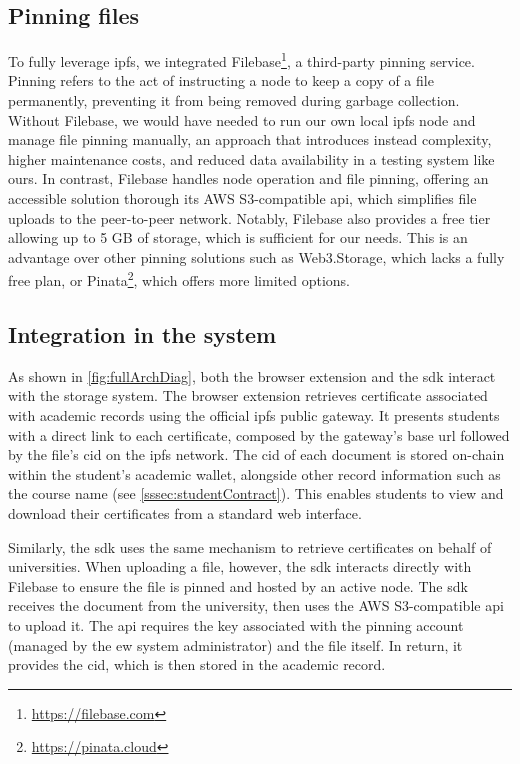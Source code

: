 \subsection{Pinning files}
To fully leverage \acrshort{ipfs}, we integrated Filebase\footnote{\url{https://filebase.com}}, a third-party pinning service. Pinning refers to the act of instructing a node to keep a copy of a file permanently, preventing it from being removed during garbage collection. Without Filebase, we would have needed to run our own local \acrshort{ipfs} node and manage file pinning manually, an approach that introduces instead complexity, higher maintenance costs, and reduced data availability in a testing system like ours. In contrast, Filebase handles node operation and file pinning, offering an accessible solution thorough its AWS S3-compatible \acrshort{api}, which simplifies file uploads to the peer-to-peer network. Notably, Filebase also provides a free tier allowing up to 5 GB of storage, which is sufficient for our needs. This is an advantage over other pinning solutions such as Web3.Storage, which lacks a fully free plan, or Pinata\footnote{\url{https://pinata.cloud}}, which offers more limited options.

\subsection{Integration in the system}
As shown in \cref{fig:fullArchDiag}, both the browser extension and the \acrshort{sdk} interact with the storage system. The browser extension retrieves certificate associated with academic records using the official \acrshort{ipfs} public gateway. It presents students with a direct link to each certificate, composed by the gateway's base \acrshort{url} followed by the file's \acrfull{cid} on the \acrshort{ipfs} network. The \acrshort{cid} of each document is stored on-chain within the student's academic wallet, alongside other record information such as the course name (see \cref{sssec:studentContract}). This enables students to view and download their certificates from a standard web interface.

Similarly, the \acrshort{sdk} uses the same mechanism to retrieve certificates on behalf of universities. When uploading a file, however, the \acrshort{sdk} interacts directly with Filebase to ensure the file is pinned and hosted by an active node. The \acrshort{sdk} receives the document from the university, then uses the AWS S3-compatible \acrshort{api} to upload it. The \acrshort{api} requires the key associated with the pinning account (managed by the \acrshort{ew} system administrator) and the file itself. In return, it provides the \acrshort{cid}, which is then stored in the academic record.

